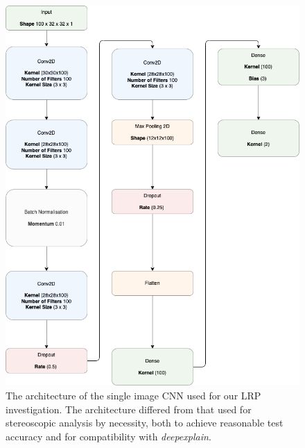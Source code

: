 \begin{figure}[ht]
        \centering \includegraphics[width=0.8\columnwidth]{figures/newhyp.png}


        \caption{
                \label{fig:lrparch} %
                The architecture of the single image CNN used for our LRP investigation. The architecture differed from that used for stereoscopic analysis by necessity,  both to achieve reasonable test accuracy and for compatibility with \textit{deepexplain}. 
        }
\end{figure}
